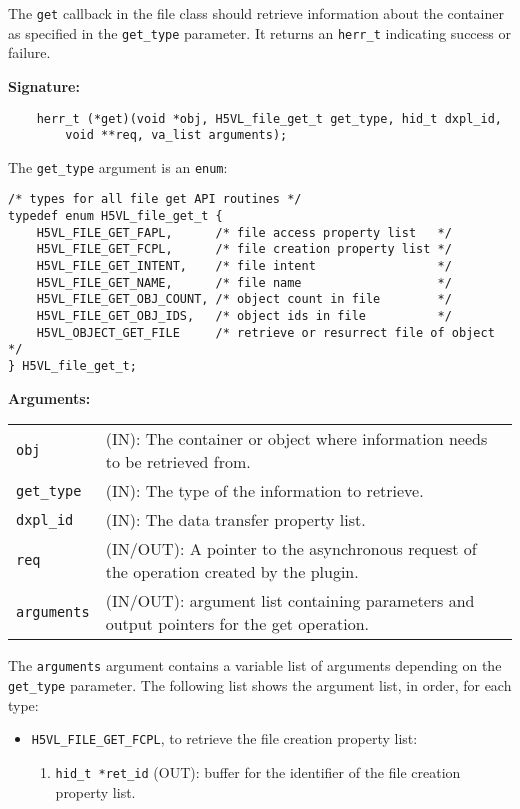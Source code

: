 The \texttt{get} callback in the file class should retrieve
information about the container as specified in the \texttt{get\_type}
parameter. It returns an \texttt{herr\_t} indicating success or failure.\bigskip

\begin{mdframed}[style=bgbox] 
\textbf{Signature:}
\begin{lstlisting}
    herr_t (*get)(void *obj, H5VL_file_get_t get_type, hid_t dxpl_id, 
        void **req, va_list arguments);
\end{lstlisting}

The \texttt{get\_type} argument is an \texttt{enum}:
\begin{lstlisting}
/* types for all file get API routines */
typedef enum H5VL_file_get_t {
    H5VL_FILE_GET_FAPL,      /* file access property list   */
    H5VL_FILE_GET_FCPL,      /* file creation property list */
    H5VL_FILE_GET_INTENT,    /* file intent                 */
    H5VL_FILE_GET_NAME,      /* file name                   */
    H5VL_FILE_GET_OBJ_COUNT, /* object count in file        */
    H5VL_FILE_GET_OBJ_IDS,   /* object ids in file          */
    H5VL_OBJECT_GET_FILE     /* retrieve or resurrect file of object */
} H5VL_file_get_t;
\end{lstlisting}

\textbf{Arguments:}\\
\begin{tabular}{l p{13.5cm}}
  \texttt{obj} & (IN): The container or object where information needs to be
  retrieved from.\\
  \texttt{get\_type} & (IN): The type of the information to retrieve.\\
  \texttt{dxpl\_id} & (IN): The data transfer property list.\\
  \texttt{req} & (IN/OUT): A pointer to the asynchronous request of the
  operation created by the plugin.\\
  \texttt{arguments} & (IN/OUT): argument list containing parameters and
  output pointers for the get operation. \\
\end{tabular}

The \texttt{arguments} argument contains a variable list of arguments
depending on the \texttt{get\_type} parameter. The following list shows
the argument list, in order, for each type:

\begin{itemize}
\item \texttt{H5VL\_FILE\_GET\_FCPL}, to retrieve the file creation
  property list:
  \begin{enumerate}
  \item \texttt{hid\_t *ret\_id} (OUT): buffer for the identifier of the
    file creation property list.
  \end{enumerate}


\end{itemize}
\end{mdframed}
